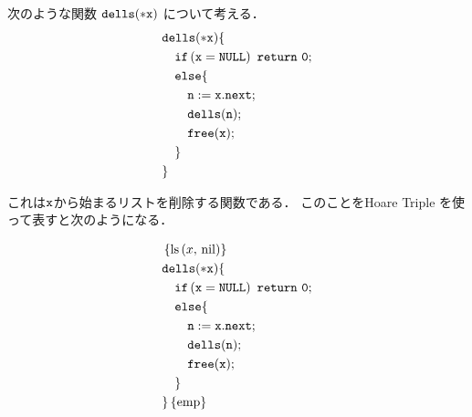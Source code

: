 \documentclass[a4paper, 10pt]{ltjsarticle}
\begin{document}
  次のような関数 $\mathtt{dells(*x)}$ について考える．
  \begin{align*}
    & \mathprogramsy{dells(*x)} \{  \\
      &\quad \mathprogramsy{if\left(x=NULL\right)\ return\ 0;} %
   \\
      &\quad   \mathprogramsy{else \{}  %
   \\
      &\qquad  \mathprogramsy{n := x.next;}  %
   \\
      &\qquad  \mathprogramsy{dells(n);}  %
   \\
      &\qquad  \mathprogramsy{free(x);}   %
   \\
      &\quad \mathprogramsy{\}} %
   \\
      &\mathprogramsy{\}} %
  \end{align*}

  これは$\mathtt{x}$から始まるリストを削除する関数である．
  このことをHoare Triple を使って表すと次のようになる．

  \begin{align*}
   &  \left\{\mathprls{x}{\mathvalnil}\right\}\\
   & \mathprogramsy{dells(*x)} \{  \\
   &\quad \mathprogramsy{if\left(x = NULL\right)\ return\ 0;} %
   \\
   &\quad   \mathprogramsy{else \{}  %
   \\
   &\qquad  \mathprogramsy{n := x.next;}  %
   \\
   &\qquad  \mathprogramsy{dells(n);}  %
   \\
   &\qquad  \mathprogramsy{free(x);}   %
   \\
   &\quad \mathprogramsy{\}} %
   \\
   &\mathprogramsy{\}} \left\{\mathemp\right\}
  \end{align*}
  
\end{document}

